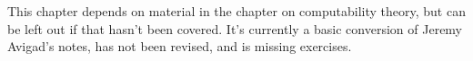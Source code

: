 \documentclass[../../../include/open-logic-chapter]{subfiles}
\begin{document}

\begin{editorial}
	This chapter depends on material in the chapter on computability
	theory, but can be left out if that hasn't been covered.  It's
	currently a basic conversion of Jeremy Avigad's notes, has not been
	revised, and is missing exercises.
\end{editorial}











\OLEndChapterHook
\end{document}
